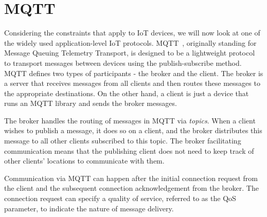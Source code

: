 \section{MQTT}

Considering the constraints that apply to IoT devices, we will now look at one of the widely used application-level IoT protocols.
MQTT~\citep{oasis_mqtt_2014}, originally standing for Message Queuing Telemetry Transport, is designed to be a lightweight protocol to transport messages between devices using the publish-subscribe method.
MQTT defines two types of participants - the broker and the client.
The broker is a server that receives messages from all clients and then routes these messages to the appropriate destinations.
On the other hand, a client is just a device that runs an MQTT library and sends the broker messages.

The broker handles the routing of messages in MQTT via \textit{topics}.
When a client wishes to publish a message, it does so on a client, and the broker distributes this message to all other clients subscribed to this topic.
The broker facilitating communication means that the publishing client does not need to keep track of other clients' locations to communicate with them.

Communication via MQTT can happen after the initial connection request from the client and the subsequent connection acknowledgement from the broker.
The connection request can specify a quality of service, referred to as the QoS parameter, to indicate the nature of message delivery.

